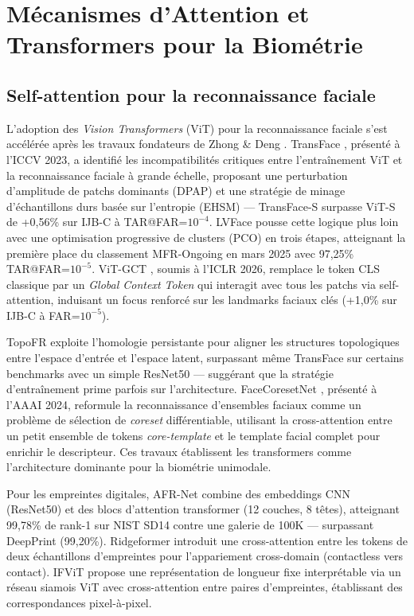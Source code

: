 \documentclass[12pt,a4paper]{report}
\begin{document}
\section{M\'{e}canismes d'Attention et Transformers pour la Biom\'{e}trie}
\label{sec:attention}

\subsection{Self-attention pour la reconnaissance faciale}

L'adoption des \textit{Vision Transformers} (ViT) pour la reconnaissance faciale s'est acc\'{e}l\'{e}r\'{e}e apr\`{e}s les travaux fondateurs de Zhong \& Deng \cite{zhong2021face}. TransFace \cite{dan2023transface}, pr\'{e}sent\'{e} \`{a} l'ICCV 2023, a identifi\'{e} les incompatibilit\'{e}s critiques entre l'entra\^{i}nement ViT et la reconnaissance faciale \`{a} grande \'{e}chelle, proposant une perturbation d'amplitude de patchs dominants (DPAP) et une strat\'{e}gie de minage d'\'{e}chantillons durs bas\'{e}e sur l'entropie (EHSM) --- TransFace-S surpasse ViT-S de +0,56\% sur IJB-C \`{a} TAR@FAR=$10^{-4}$. LVFace \cite{you2025lvface} pousse cette logique plus loin avec une optimisation progressive de clusters (PCO) en trois \'{e}tapes, atteignant la premi\`{e}re place du classement MFR-Ongoing en mars 2025 avec 97,25\% TAR@FAR=$10^{-5}$. ViT-GCT \cite{chettaoui2026vitgct}, soumis \`{a} l'ICLR 2026, remplace le token CLS classique par un \textit{Global Context Token} qui interagit avec tous les patchs via self-attention, induisant un focus renforc\'{e} sur les landmarks faciaux cl\'{e}s (+1,0\% sur IJB-C \`{a} FAR=$10^{-5}$).

TopoFR \cite{dan2024topoFR} exploite l'homologie persistante pour aligner les structures topologiques entre l'espace d'entr\'{e}e et l'espace latent, surpassant m\^{e}me TransFace sur certains benchmarks avec un simple ResNet50 --- sugg\'{e}rant que la strat\'{e}gie d'entra\^{i}nement prime parfois sur l'architecture. FaceCoresetNet \cite{shapira2024facecoreset}, pr\'{e}sent\'{e} \`{a} l'AAAI 2024, reformule la reconnaissance d'ensembles faciaux comme un probl\`{e}me de s\'{e}lection de \textit{coreset} diff\'{e}rentiable, utilisant la cross-attention entre un petit ensemble de tokens \textit{core-template} et le template facial complet pour enrichir le descripteur. Ces travaux \'{e}tablissent les transformers comme l'architecture dominante pour la biom\'{e}trie unimodale.

Pour les empreintes digitales, AFR-Net \cite{grosz2024afrnet} combine des embeddings CNN (ResNet50) et des blocs d'attention transformer (12 couches, 8 t\^{e}tes), atteignant 99,78\% de rank-1 sur NIST SD14 contre une galerie de 100K --- surpassant DeepPrint (99,20\%). Ridgeformer \cite{pandey2025ridgeformer} introduit une cross-attention entre les tokens de deux \'{e}chantillons d'empreintes pour l'appariement cross-domain (contactless vers contact). IFViT \cite{qiu2024ifvit} propose une repr\'{e}sentation de longueur fixe interpr\'{e}table via un r\'{e}seau siamois ViT avec cross-attention entre paires d'empreintes, \'{e}tablissant des correspondances pixel-\`{a}-pixel.
\end{document}
